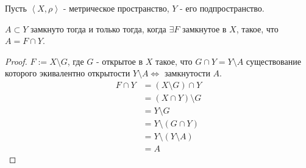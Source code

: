 \begin{theorem} \thmslashn

    Пусть $\left<X, \rho\right>$ - метрическое пространство, $Y$ - его подпространство.

    $A \subset Y$ замкнуто тогда и только тогда, когда $\exists{F}$ замкнутое в $X$, такое, что $A = F\cap Y$.
    \begin{proof} \thmslashn
    
        $F := X \setminus G$, где $G$ - открытое в  $X$ такое, что  $G\cap Y = Y \setminus A$ существование которого экивалентно открытости $Y \setminus A \iff $ замкнутости $A$.
        \begin{equation*}
            \begin{split}
                F\cap Y 
                &= (X \setminus G)\cap Y\\
                &= (X\cap Y) \setminus G\\
                &= Y \setminus G\\
                &= Y \setminus (G\cap Y)\\
                &= Y \setminus (Y \setminus A)\\
                &= A
            \end{split}
        \end{equation*}
    \end{proof}
\end{theorem}
